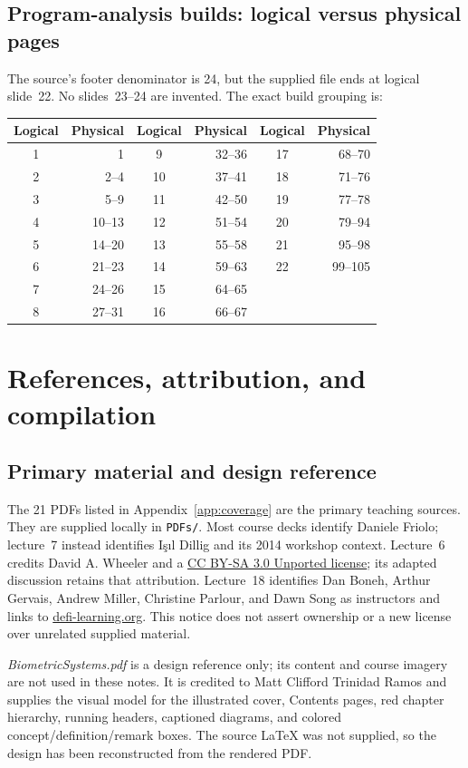 \documentclass[11pt,a4paper]{article}
\newcommand{\currentmodule}{Contents}
\newcommand{\module}[2]{\par\Needspace{8\baselineskip}\gdef\currentmodule{#1}\section{#1}\label{#2}}
\numberwithin{figure}{section}
\begin{document}
\subsection{Program-analysis builds: logical versus physical pages}
The source's footer denominator is 24, but the supplied file ends at logical slide~22. No slides~23--24 are invented. The exact build grouping is:
\begin{center}\small\begin{tabular}{@{}crcrcr@{}}\toprule
Logical & Physical & Logical & Physical & Logical & Physical\\\midrule
1 & 1 & 9 & 32--36 & 17 & 68--70\\
2 & 2--4 & 10 & 37--41 & 18 & 71--76\\
3 & 5--9 & 11 & 42--50 & 19 & 77--78\\
4 & 10--13 & 12 & 51--54 & 20 & 79--94\\
5 & 14--20 & 13 & 55--58 & 21 & 95--98\\
6 & 21--23 & 14 & 59--63 & 22 & 99--105\\
7 & 24--26 & 15 & 64--65 & & \\
8 & 27--31 & 16 & 66--67 & & \\\bottomrule
\end{tabular}\end{center}

\module{References, attribution, and compilation}{app:refs}
\subsection{Primary material and design reference}
The 21 PDFs listed in Appendix~\ref{app:coverage} are the primary teaching sources. They are supplied locally in \nolinkurl{PDFs/}. Most course decks identify Daniele Friolo; lecture~7 instead identifies I\c{s}\i l Dillig and its 2014 workshop context. Lecture~6 credits David A. Wheeler and a \href{https://creativecommons.org/licenses/by-sa/3.0/}{CC BY-SA 3.0 Unported license}; its adapted discussion retains that attribution. Lecture~18 identifies Dan Boneh, Arthur Gervais, Andrew Miller, Christine Parlour, and Dawn Song as instructors and links to \href{https://defi-learning.org}{defi-learning.org}. This notice does not assert ownership or a new license over unrelated supplied material.

\emph{BiometricSystems.pdf} is a design reference only; its content and course imagery are not used in these notes. It is credited to Matt Clifford Trinidad Ramos and supplies the visual model for the illustrated cover, Contents pages, red chapter hierarchy, running headers, captioned diagrams, and colored concept/definition/remark boxes. The source LaTeX was not supplied, so the design has been reconstructed from the rendered PDF.
\end{document}
